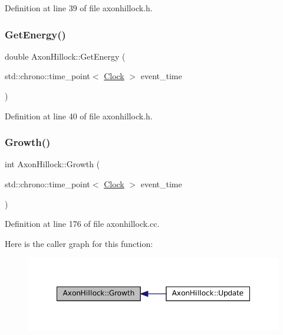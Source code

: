 Definition at line 39 of file axonhillock.\+h.

\mbox{\label{class_axon_hillock_ab5ac3ab8771b96acf7e3fa07152525a5}} 
\subsubsection{\texorpdfstring{Get\+Energy()}{GetEnergy()}}
{\footnotesize\ttfamily double Axon\+Hillock\+::\+Get\+Energy (\begin{DoxyParamCaption}\item[{std\+::chrono\+::time\+\_\+point$<$ \mbox{\hyperlink{universe_8h_a0ef8d951d1ca5ab3cfaf7ab4c7a6fd80}{Clock}} $>$}]{event\+\_\+time }\end{DoxyParamCaption})\hspace{0.3cm}{\ttfamily [inline]}}



Definition at line 40 of file axonhillock.\+h.

\mbox{\label{class_axon_hillock_a5c5cd9008f1410898980528b959d668e}} 
\subsubsection{\texorpdfstring{Growth()}{Growth()}}
{\footnotesize\ttfamily int Axon\+Hillock\+::\+Growth (\begin{DoxyParamCaption}\item[{std\+::chrono\+::time\+\_\+point$<$ \mbox{\hyperlink{universe_8h_a0ef8d951d1ca5ab3cfaf7ab4c7a6fd80}{Clock}} $>$}]{event\+\_\+time }\end{DoxyParamCaption})}



Definition at line 176 of file axonhillock.\+cc.

Here is the caller graph for this function\+:\nopagebreak
\begin{figure}[H]
\begin{center}
\leavevmode
\includegraphics[width=348pt]{class_axon_hillock_a5c5cd9008f1410898980528b959d668e_icgraph}
\end{center}
\end{figure}
\mbox{\label{class_axon_hillock_ae7c379ef3a70c8a43a0f105ccc94b54b}} 
